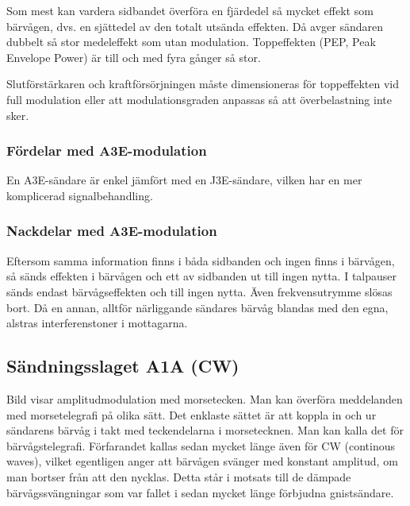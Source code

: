 Som mest kan vardera sidbandet överföra en fjärdedel så mycket effekt som
bärvågen, dvs. en sjättedel av den totalt utsända effekten.
Då avger sändaren dubbelt så stor medeleffekt som utan modulation.
Toppeffekten (PEP, Peak Envelope Power) är till och med fyra gånger så stor.

Slutförstärkaren och kraftförsörjningen måste dimensioneras för toppeffekten vid
full modulation eller att modulationsgraden anpassas så att överbelastning inte
sker.

\subsubsection{Fördelar med A3E-modulation}

En A3E-sändare är enkel jämfört med en J3E-sändare, vilken har en mer
komplicerad signalbehandling.


\subsubsection{Nackdelar med A3E-modulation}

Eftersom samma information finns i båda sidbanden och ingen finns i bärvågen,
så sänds effekten i bärvågen och ett av sidbanden ut till ingen nytta.
I talpauser sänds endast bärvågseffekten och till ingen nytta.
Även frekvensutrymme slösas bort.
Då en annan, alltför närliggande sändares bärvåg blandas med den egna,
alstras interferenstoner i mottagarna.


\subsection{Sändningsslaget A1A (CW)}
\label{modulation_cw}


Bild  visar amplitudmodulation med morsetecken.
Man kan överföra meddelanden med morsetelegrafi på olika sätt.
Det enklaste sättet är att koppla in och ur sändarens bärvåg i takt med
teckendelarna i morsetecknen.
Man kan kalla det för bärvågstelegrafi.
Förfarandet kallas sedan mycket länge även för CW (continous waves), vilket
egentligen anger att bärvågen svänger med konstant amplitud, om man bortser
från att den nycklas.
Detta står i motsats till de dämpade bärvågssvängningar som var fallet i sedan
mycket länge förbjudna gnistsändare.

